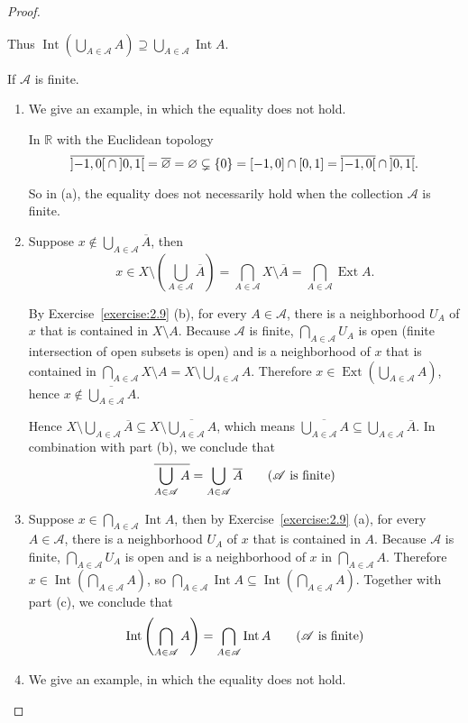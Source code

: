 \begin{proof}
\begin{enumerate}[label={(\alph*)}]
		      Thus $\operatorname{Int}\left(\bigcup_{A\in\mathscr{A}}A\right) \supseteq  \bigcup_{A\in\mathscr{A}}\operatorname{Int}A$.
	\end{enumerate}
	\hfill

	If $\mathscr{A}$ is finite.
	\begin{enumerate}[label={(\alph*)}]
		\item  We give an example, in which the equality does not hold.

		      In $\mathbb{R}$ with the Euclidean topology
		      \[
			      \overline{\left]{-1,0}\right[ \cap \left]{0,1}\right[} = \overline{\varnothing} = \varnothing \subsetneq \{ 0 \} = \left[{-1,0}\right] \cap \left[{0,1}\right] = \overline{\left]{-1,0}\right[}\cap\overline{\left]{0,1}\right[}.
		      \]

		      So in (a), the equality does not necessarily hold when the collection $\mathscr{A}$ is finite.
		\item Suppose $x\notin \bigcup_{A\in\mathscr{A}}\overline{A}$, then
		      \[
			      x\in X\setminus \left(\bigcup_{A\in\mathscr{A}}\overline{A}\right) = \bigcap_{A\in\mathscr{A}}X\setminus\overline{A} = \bigcap_{A\in\mathscr{A}}\operatorname{Ext}A.
		      \]

		      By Exercise~\ref{exercise:2.9} (b), for every $A\in\mathscr{A}$, there is a neighborhood $U_{A}$ of $x$ that is contained in $X\setminus A$. Because $\mathscr{A}$ is finite, $\bigcap_{A\in\mathscr{A}}U_{A}$ is open (finite intersection of open subsets is open) and is a neighborhood of $x$ that is contained in $\bigcap_{A\in\mathscr{A}}X\setminus A = X\setminus\bigcup_{A\in\mathscr{A}}A$. Therefore $x\in \operatorname{Ext}\left({\bigcup_{A\in\mathscr{A}}A}\right)$, hence $x\notin\overline{\bigcup_{A\in\mathscr{A}}A}$.

		      Hence $X\setminus \bigcup_{A\in\mathscr{A}}\overline{A} \subseteq X\setminus \overline{\bigcup_{A\in\mathscr{A}}A}$, which means $\overline{\bigcup_{A\in\mathscr{A}}A}\subseteq \bigcup_{A\in\mathscr{A}}\overline{A}$. In combination with part (b), we conclude that
		      \[
			      \overline{\bigcup_{A\in\mathscr{A}}A} = \bigcup_{A\in\mathscr{A}}\overline{A} \tag{$\mathscr{A}$ is finite}
		      \]
		\item Suppose $x\in \bigcap_{A\in\mathscr{A}}\operatorname{Int}A$, then by Exercise~\ref{exercise:2.9} (a), for every $A\in\mathscr{A}$, there is a neighborhood $U_{A}$ of $x$ that is contained in $A$. Because $\mathscr{A}$ is finite, $\bigcap_{A\in\mathscr{A}}U_{A}$ is open and is a neighborhood of $x$ in $\bigcap_{A\in\mathscr{A}}A$. Therefore $x\in \operatorname{Int}\left(\bigcap_{A\in\mathscr{A}}A\right)$, so $\bigcap_{A\in\mathscr{A}}\operatorname{Int}A \subseteq \operatorname{Int}\left(\bigcap_{A\in\mathscr{A}}A\right)$. Together with part (c), we conclude that
		      \[
			      \operatorname{Int}\left(\bigcap_{A\in\mathscr{A}}A\right) = \bigcap_{A\in\mathscr{A}}\operatorname{Int}A \tag{$\mathscr{A}$ is finite}
		      \]
		\item We give an example, in which the equality does not hold.


\end{enumerate}
\end{proof}
